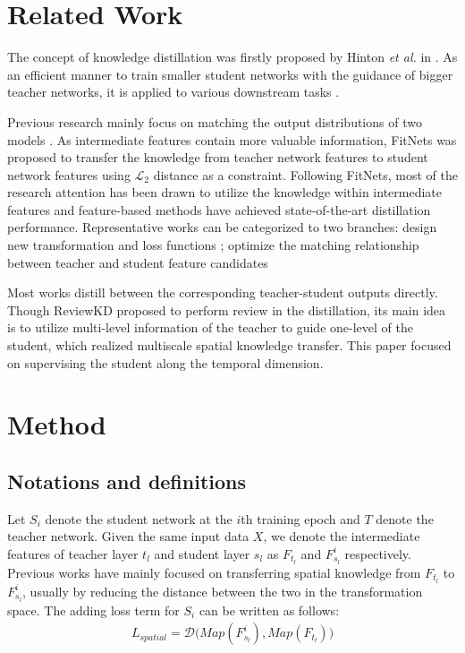 \documentclass[letterpaper]{article} %
\begin{document}
\section{Related Work}
The concept of knowledge distillation was firstly proposed by Hinton \emph{et al.} in \cite{hinton2015distilling}. As an efficient manner to train smaller student networks with the guidance of bigger teacher networks, it is applied to various downstream tasks \cite{li2017mimicking, li2021online}.

Previous research mainly focus on matching the output distributions of two models \cite{hinton2015distilling,mirzadeh2020improved,cho2019efficacy,furlanello2018born}. As intermediate features contain more valuable information, FitNets \cite{romero2014fitnets} was proposed to transfer the knowledge from teacher network features to student network features using $\mathcal{L}_{2}$ distance as a constraint. Following FitNets, most of the research attention has been drawn to utilize the knowledge within intermediate features and feature-based methods have achieved state-of-the-art distillation performance. Representative works can be categorized to two branches: design new transformation and loss functions \cite{zagoruyko2016paying,tian2019contrastive,heo2019comprehensive}; optimize the matching relationship between teacher and student feature candidates \cite{chen2021distilling,ji2021show}


Most works distill between the corresponding teacher-student outputs directly. Though ReviewKD \cite{chen2021distilling} proposed to perform review in the distillation, its main idea is to utilize multi-level information of the teacher to guide one-level of the student, which realized multiscale spatial knowledge transfer. This paper focused on supervising the student along the temporal dimension.

\section{Method}

\subsection{Notations and definitions}
Let $S_{i}$ denote the student network at the $i$th training epoch and $T$ denote the teacher network. Given the same input data $X$, we denote the intermediate features of teacher layer $t_{l}$ and student layer $s_{l}$ as $F_{t_{l}}$ and $F_{s_{l}}^{i}$ respectively.
Previous works have mainly focused on transferring spatial knowledge from $F_{t_{l}}$ to $F_{s_{l}}^{i}$, usually by reducing the distance between the two in the transformation space. The adding loss term for $S_{i}$ can be written as follows:
\begin{align}
	\label{eq:1}
	L_{spatial} = \mathcal{D}\Big(Map(F_{s_{l}}^{i}),Map(F_{t_{l}})\Big)
\end{align}
\end{document}
